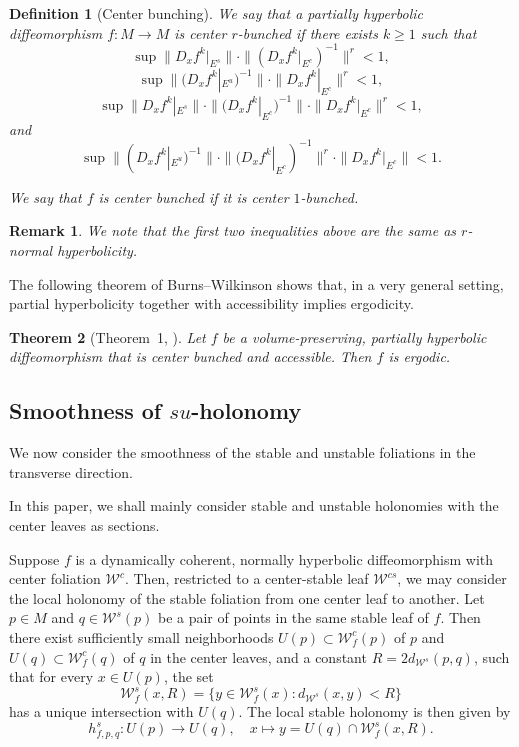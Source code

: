 \documentclass[11pt]{amsart}
\numberwithin{equation}{section}
\newcommand{\W}{\mathcal{W}}
\theoremstyle{plain}
\newtheorem{thm}{Theorem}[section]
\newtheorem{rmk}[thm]{Remark}
\newtheorem{defi}{Definition}[section]
\begin{document}
\begin{defi}[Center bunching]
We say that a partially hyperbolic diffeomorphism $f:M\to M$ is \emph{center $r$-bunched} if there exists $k\ge 1$ such that
\[
\sup \|D_xf^k|_{E^s}\|\cdot \|(D_xf^k|_{E^c})^{-1}\|^r<1,
\]
\[
\sup \|(D_xf^k|_{E^u})^{-1}\|\cdot \|D_xf^k|_{E^c}\|^r<1,
\]
\[
\sup \|D_xf^k|_{E^s}\|\cdot \|(D_xf^k|_{E^c})^{-1}\|\cdot \|D_xf^k|_{E^c}\|^r<1,
\]
and
\[
\sup \|(D_xf^k|_{E^u})^{-1}\|\cdot \|(D_xf^k|_{E^c})^{-1}\|^r\cdot \|D_xf^k|_{E^c}\|<1.
\]

We say that $f$ is \emph{center bunched} if it is center $1$-bunched.
\end{defi}

\begin{rmk}
We note that the first two inequalities above are the same as $r$-normal hyperbolicity.
\end{rmk}

The following theorem of Burns--Wilkinson \cite{BWerg} shows that, in a very general setting, partial hyperbolicity together with accessibility implies ergodicity.

\begin{thm}[Theorem~1, \cite{BWerg}]\label{accerg}
Let $f$ be a volume-preserving, partially hyperbolic diffeomorphism that is center bunched and accessible. Then $f$ is ergodic.
\end{thm}

\subsection{Smoothness of $su$-holonomy}
We now consider the smoothness of the stable and unstable foliations in the transverse direction.

In this paper, we shall mainly consider stable and unstable holonomies with the center leaves as sections.

Suppose $f$ is a dynamically coherent, normally hyperbolic diffeomorphism with center foliation $\W^c$. Then, restricted to a center-stable leaf $\W^{cs}$, we may consider the local holonomy of the stable foliation from one center leaf to another. Let $p\in M$ and $q\in \W^s(p)$ be a pair of points in the same stable leaf of $f$. Then there exist sufficiently small neighborhoods $U(p)\subset \W^c_f(p)$ of $p$ and $U(q)\subset \W^c_f(q)$ of $q$ in the center leaves, and a constant $R=2d_{\W^s}(p,q)$, such that for every $x\in U(p)$, the set
\[
\W^s_f(x,R)=\{y\in \W^s_f(x): d_{\W^s}(x,y)<R\}
\]
has a unique intersection with $U(q)$. The local stable holonomy is then given by
\[
h^s_{f,p,q}: U(p)\to U(q), \quad x\mapsto y= U(q)\cap \W^s_f(x,R).
\]
\end{document}
